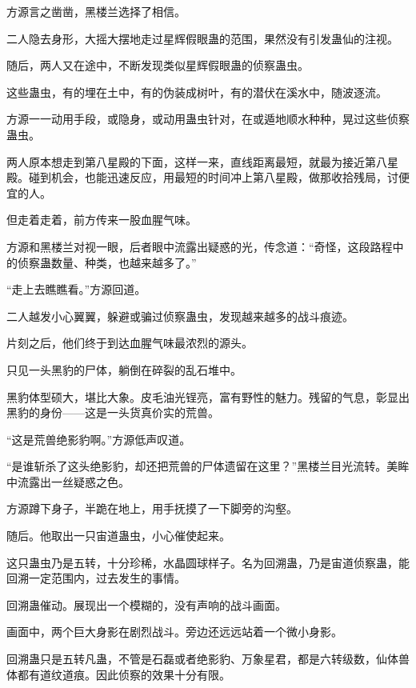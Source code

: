 
\begin{this_body}

方源言之凿凿，黑楼兰选择了相信。

二人隐去身形，大摇大摆地走过星辉假眼蛊的范围，果然没有引发蛊仙的注视。

随后，两人又在途中，不断发现类似星辉假眼蛊的侦察蛊虫。

这些蛊虫，有的埋在土中，有的伪装成树叶，有的潜伏在溪水中，随波逐流。

方源一一动用手段，或隐身，或动用蛊虫针对，在或遁地顺水种种，晃过这些侦察蛊虫。

两人原本想走到第八星殿的下面，这样一来，直线距离最短，就最为接近第八星殿。碰到机会，也能迅速反应，用最短的时间冲上第八星殿，做那收拾残局，讨便宜的人。

但走着走着，前方传来一股血腥气味。

方源和黑楼兰对视一眼，后者眼中流露出疑惑的光，传念道：“奇怪，这段路程中的侦察蛊数量、种类，也越来越多了。”

“走上去瞧瞧看。”方源回道。

二人越发小心翼翼，躲避或骗过侦察蛊虫，发现越来越多的战斗痕迹。

片刻之后，他们终于到达血腥气味最浓烈的源头。

只见一头黑豹的尸体，躺倒在碎裂的乱石堆中。

黑豹体型硕大，堪比大象。皮毛油光锃亮，富有野性的魅力。残留的气息，彰显出黑豹的身份——这是一头货真价实的荒兽。

“这是荒兽绝影豹啊。”方源低声叹道。

“是谁斩杀了这头绝影豹，却还把荒兽的尸体遗留在这里？”黑楼兰目光流转。美眸中流露出一丝疑惑之色。

方源蹲下身子，半跪在地上，用手抚摸了一下脚旁的沟壑。

随后。他取出一只宙道蛊虫，小心催使起来。

这只蛊虫乃是五转，十分珍稀，水晶圆球样子。名为回溯蛊，乃是宙道侦察蛊，能回溯一定范围内，过去发生的事情。

回溯蛊催动。展现出一个模糊的，没有声响的战斗画面。

画面中，两个巨大身影在剧烈战斗。旁边还远远站着一个微小身影。

回溯蛊只是五转凡蛊，不管是石磊或者绝影豹、万象星君，都是六转级数，仙体兽体都有道纹道痕。因此侦察的效果十分有限。


\end{this_body}
